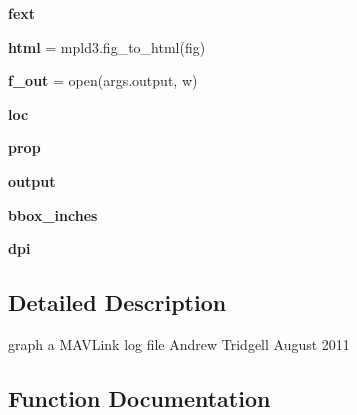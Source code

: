 \begin{DoxyCompactItemize}
{\bfseries fext}
\item 
\mbox{\label{namespacepymavlink_1_1tools_1_1mavgraph_a0177eb20ccaa0775cf9fe35f8733252e}} 
{\bfseries html} = mpld3.\+fig\+\_\+to\+\_\+html(fig)
\item 
\mbox{\label{namespacepymavlink_1_1tools_1_1mavgraph_a2c2895972745d7c66e968c45f5b997ae}} 
{\bfseries f\+\_\+out} = open(args.\+output, \textquotesingle{}w\textquotesingle{})
\item 
\mbox{\label{namespacepymavlink_1_1tools_1_1mavgraph_a2df6fa1e6eceda8d7c102aef24d0dbd1}} 
{\bfseries loc}
\item 
\mbox{\label{namespacepymavlink_1_1tools_1_1mavgraph_a2ba79cea22b05cac13b0a1873526359b}} 
{\bfseries prop}
\item 
\mbox{\label{namespacepymavlink_1_1tools_1_1mavgraph_a73cb0e108dbf9cebc0071578e1ee24d2}} 
{\bfseries output}
\item 
\mbox{\label{namespacepymavlink_1_1tools_1_1mavgraph_a2205030986d0f4e395eae2699c316ce6}} 
{\bfseries bbox\+\_\+inches}
\item 
\mbox{\label{namespacepymavlink_1_1tools_1_1mavgraph_a4a1f0f211bdcf7fa63db57c19a3d4080}} 
{\bfseries dpi}
\end{DoxyCompactItemize}


\subsection{Detailed Description}
\begin{DoxyVerb}graph a MAVLink log file
Andrew Tridgell August 2011
\end{DoxyVerb}
 

\subsection{Function Documentation}
\mbox{\label{namespacepymavlink_1_1tools_1_1mavgraph_a798da2b2c7d6fe51f1eecc3dcba95079}} 
